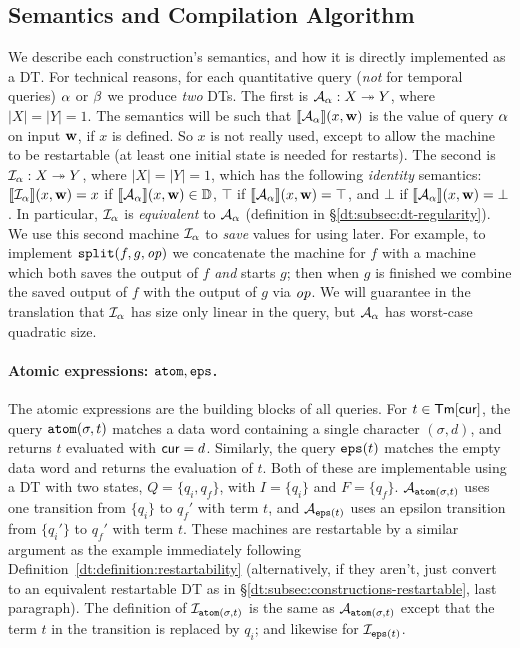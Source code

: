 \subsection{Semantics and Compilation Algorithm}
\label{dt:subsec:rm-compilation}

We describe each construction's semantics, and how it is directly implemented as a DT.
For technical reasons, for each quantitative query (\emph{not} for temporal queries) $\alpha$ or $\beta$ we produce \emph{two} DTs. The first is $\mathcal{A}_{\alpha}: X \twoheadrightarrow Y$, where $|X| = |Y| = 1$. The semantics will be such that $\llbracket \mathcal{A}_{\alpha} \rrbracket(x,\textbf{w})$ is the value of query $\alpha$ on input $\textbf{w}$, if $x$ is defined. So $x$ is not really used, except to allow the machine to be restartable (at least one initial state is needed for restarts). The second is $\mathcal{I}_{\alpha}: X \twoheadrightarrow Y$, where $|X|=|Y|=1$, which has the following \emph{identity} semantics: $\llbracket \mathcal{I}_{\alpha} \rrbracket(x,\textbf{w}) = x$ if $\llbracket \mathcal{A}_{\alpha} \rrbracket(x,\textbf{w}) \in \mathbb{D}$, $\top$ if $\llbracket \mathcal{A}_{\alpha} \rrbracket(x,\textbf{w}) = \top$, and $\bot$ if $\llbracket \mathcal{A}_{\alpha} \rrbracket(x,\textbf{w}) = \bot$.
In particular, $\mathcal{I}_{\alpha}$ is \emph{equivalent} to $\mathcal{A}_{\alpha}$ (definition in \S\ref{dt:subsec:dt-regularity}).
We use this second machine $\mathcal{I}_{\alpha}$ to \emph{save} values for using later. For example, to implement $\texttt{split}(f,g,\mathit{op})$ we concatenate the machine for $f$ with a machine which both saves the output of $f$ \emph{and} starts $g$; then when $g$ is finished we combine the saved output of $f$ with the output of $g$ via $\mathit{op}$. We will guarantee in the translation that $\mathcal{I}_{\alpha}$ has size only linear in the query, but $\mathcal{A}_{\alpha}$ has worst-case quadratic size.

\paragraph*{Atomic expressions: $\texttt{atom}, \texttt{eps}$.}
The atomic expressions are the building blocks of all queries. For $t \in \textsf{Tm}[\mathsf{cur}]$, the query $\texttt{atom}(\sigma, t)$ matches a data word containing a single character $(\sigma, d)$, and returns $t$ evaluated with $\mathsf{cur} = d$. Similarly, the query $\texttt{eps}(t)$ matches the empty data word and returns the evaluation of $t$.
Both of these are implementable using a DT with two states, $Q = \{q_i, q_f\}$, with $I = \{q_i\}$ and $F = \{q_f\}$.
$\mathcal{A}_{\texttt{atom}(\sigma, t)}$ uses one transition from $\{q_i\}$ to $q_f'$ with term $t$, and $\mathcal{A}_{\texttt{eps}(t)}$ uses an epsilon transition from $\{q_i'\}$ to $q_f'$ with term $t$.
These machines are restartable by a similar argument as the example immediately following Definition~\ref{dt:definition:restartability} (alternatively, if they aren't, just convert to an equivalent restartable DT as in \S\ref{dt:subsec:constructions-restartable}, last paragraph).
The definition of $\mathcal{I}_{\texttt{atom}(\sigma, t)}$ is the same as $\mathcal{A}_{\texttt{atom}(\sigma, t)}$ except that the term $t$ in the transition is replaced by $q_i$; and likewise for $\mathcal{I}_{\texttt{eps}(t)}$.

